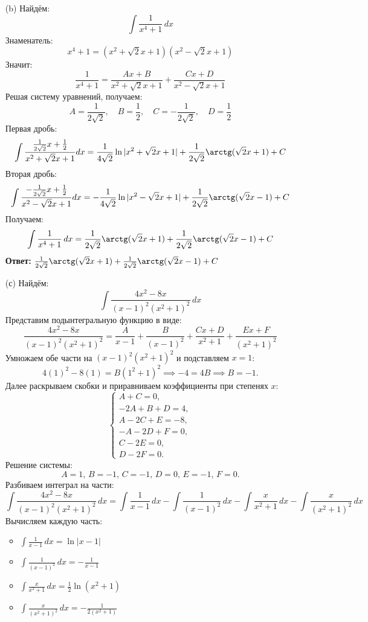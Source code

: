 \documentclass[a4paper]{article}
\begin{document}
\begin{enumerate}
\begin{enumerate}
    \item[(b)]Найдём:
    $$\int \frac{1}{x^4 + 1} \, dx $$
    Знаменатель:
    \[
    x^4 + 1 = (x^2 + \sqrt{2}x + 1)(x^2 - \sqrt{2}x + 1)
    \]
    Значит:
    \[
    \frac{1}{x^4 + 1} = \frac{Ax + B}{x^2 + \sqrt{2}x + 1} + \frac{Cx + D}{x^2 - \sqrt{2}x + 1}
    \]
    Решая систему уравнений, получаем:  
    \[
    A = \frac{1}{2\sqrt{2}}, \quad B = \frac{1}{2}, \quad C = -\frac{1}{2\sqrt{2}}, \quad D = \frac{1}{2}
    \]
    Первая дробь:
    \[
    \int \frac{\frac{1}{2\sqrt{2}}x + \frac{1}{2}}{x^2 + \sqrt{2}x + 1} dx = \frac{1}{4\sqrt{2}} \ln|x^2 + \sqrt{2}x + 1| + \frac{1}{2\sqrt{2}} \arctg(\sqrt{2}x + 1) + C
    \]
    Вторая дробь:
    \[
    \int \frac{-\frac{1}{2\sqrt{2}}x + \frac{1}{2}}{x^2 - \sqrt{2}x + 1} dx= -\frac{1}{4\sqrt{2}} \ln|x^2 - \sqrt{2}x + 1| + \frac{1}{2\sqrt{2}} \arctg(\sqrt{2}x - 1) + C
    \]
    Получаем:
    $$\int \frac{1}{x^4 + 1} \, dx = \frac{1}{2\sqrt{2}} \arctg(\sqrt{2}x + 1) + \frac{1}{2\sqrt{2}} \arctg(\sqrt{2}x - 1) + C$$
    \textbf{Ответ:} $\frac{1}{2\sqrt{2}} \arctg(\sqrt{2}x + 1) + \frac{1}{2\sqrt{2}} \arctg(\sqrt{2}x - 1) + C$\\
    
    \item[(с)]Найдём:
    $$\int \frac{4x^2 - 8x}{(x-1)^2(x^2 + 1)^2} \, dx$$
    Представим подынтегральную функцию в виде:  
   \[
   \frac{4x^2 - 8x}{(x-1)^2(x^2 + 1)^2} = \frac{A}{x - 1} + \frac{B}{(x - 1)^2} + \frac{Cx + D}{x^2 + 1} + \frac{Ex + F}{(x^2 + 1)^2}
   \]
   Умножаем обе части на \((x-1)^2(x^2 + 1)^2\) и подставляем \(x = 1\):  
   \[
   4(1)^2 - 8(1) = B(1^2 + 1)^2 \implies -4 = 4B \implies B = -1.
   \]  
   Далее раскрываем скобки и приравниваем коэффициенты при степенях \(x\):  
   \[
   \begin{cases} 
   A + C = 0, \\
   -2A + B + D = 4, \\
   A - 2C + E = -8, \\
   -A - 2D + F = 0, \\
   C - 2E = 0, \\
   D - 2F = 0.
   \end{cases}
   \]  
   Решение системы:  
   \[
   A = 1, \, B = -1, \, C = -1, \, D = 0, \, E = -1, \, F = 0.
   \]
   Разбиваем интеграл на части:  
   \small{\[
    \int \frac{4x^2 - 8x}{(x-1)^2(x^2 + 1)^2} \, dx= \int \frac{1}{x - 1} \, dx - \int \frac{1}{(x - 1)^2} \, dx - \int \frac{x}{x^2 + 1} \, dx - \int \frac{x}{(x^2 + 1)^2} \, dx
   \]}
   Вычисляем каждую часть:  
    \begin{itemize}
    \item \(\int \frac{1}{x - 1} \, dx = \ln|x - 1|\) 
    \item \(\int \frac{1}{(x - 1)^2} \, dx = -\frac{1}{x - 1}\)  
    \item \(\int \frac{x}{x^2 + 1} \, dx = \frac{1}{2} \ln(x^2 + 1)\)  
    \item \(\int \frac{x}{(x^2 + 1)^2} \, dx = -\frac{1}{2(x^2 + 1)}\) 
   \end{itemize}


\end{enumerate}
\end{enumerate}
\end{document}
